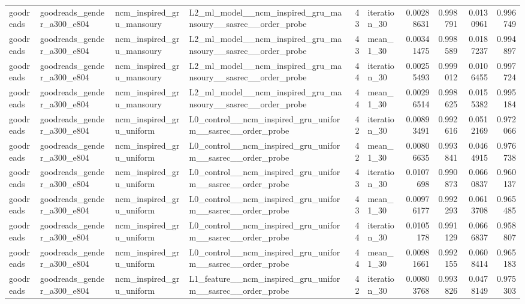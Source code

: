 \begin{table}[htbp!]
\begin{tabular}{llllrlrrrr}
goodreads & goodreads\_gender\_a300\_e804 & ncm\_inspired\_gru\_mansoury & L2\_ml\_model\_\_ncm\_inspired\_gru\_mansoury\_\_sasrec\_\_order\_probe & 43 & iteration\_30 & 0.00288631 & 0.998791 & 0.0130961 & 0.996749 \\
goodreads & goodreads\_gender\_a300\_e804 & ncm\_inspired\_gru\_mansoury & L2\_ml\_model\_\_ncm\_inspired\_gru\_mansoury\_\_sasrec\_\_order\_probe & 43 & mean\_1\_30 & 0.00341475 & 0.998589 & 0.0187237 & 0.994897 \\
goodreads & goodreads\_gender\_a300\_e804 & ncm\_inspired\_gru\_mansoury & L2\_ml\_model\_\_ncm\_inspired\_gru\_mansoury\_\_sasrec\_\_order\_probe & 44 & iteration\_30 & 0.00255493 & 0.999012 & 0.0106455 & 0.997724 \\
goodreads & goodreads\_gender\_a300\_e804 & ncm\_inspired\_gru\_mansoury & L2\_ml\_model\_\_ncm\_inspired\_gru\_mansoury\_\_sasrec\_\_order\_probe & 44 & mean\_1\_30 & 0.00296514 & 0.998625 & 0.0155382 & 0.995184 \\
goodreads & goodreads\_gender\_a300\_e804 & ncm\_inspired\_gru\_uniform & L0\_control\_\_ncm\_inspired\_gru\_uniform\_\_sasrec\_\_order\_probe & 42 & iteration\_30 & 0.00893491 & 0.992616 & 0.0512169 & 0.972066 \\
goodreads & goodreads\_gender\_a300\_e804 & ncm\_inspired\_gru\_uniform & L0\_control\_\_ncm\_inspired\_gru\_uniform\_\_sasrec\_\_order\_probe & 42 & mean\_1\_30 & 0.00806635 & 0.993841 & 0.0464915 & 0.976738 \\
goodreads & goodreads\_gender\_a300\_e804 & ncm\_inspired\_gru\_uniform & L0\_control\_\_ncm\_inspired\_gru\_uniform\_\_sasrec\_\_order\_probe & 43 & iteration\_30 & 0.0107698 & 0.990873 & 0.0660837 & 0.960137 \\
goodreads & goodreads\_gender\_a300\_e804 & ncm\_inspired\_gru\_uniform & L0\_control\_\_ncm\_inspired\_gru\_uniform\_\_sasrec\_\_order\_probe & 43 & mean\_1\_30 & 0.00976177 & 0.992293 & 0.0613708 & 0.965485 \\
goodreads & goodreads\_gender\_a300\_e804 & ncm\_inspired\_gru\_uniform & L0\_control\_\_ncm\_inspired\_gru\_uniform\_\_sasrec\_\_order\_probe & 44 & iteration\_30 & 0.0105178 & 0.991129 & 0.0666837 & 0.958807 \\
goodreads & goodreads\_gender\_a300\_e804 & ncm\_inspired\_gru\_uniform & L0\_control\_\_ncm\_inspired\_gru\_uniform\_\_sasrec\_\_order\_probe & 44 & mean\_1\_30 & 0.00981661 & 0.992155 & 0.0608414 & 0.965183 \\
goodreads & goodreads\_gender\_a300\_e804 & ncm\_inspired\_gru\_uniform & L1\_feature\_\_ncm\_inspired\_gru\_uniform\_\_sasrec\_\_order\_probe & 42 & iteration\_30 & 0.00803768 & 0.993826 & 0.0478149 & 0.975303 \\

\end{tabular}
\end{table}

